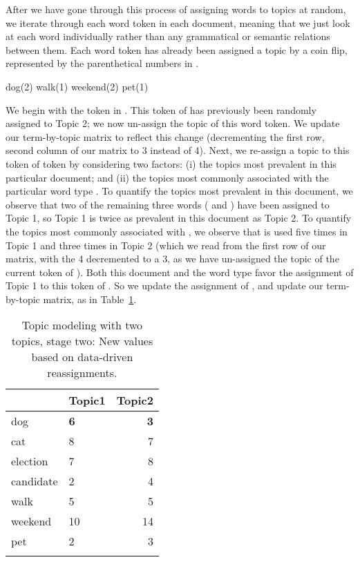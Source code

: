 After we have gone through this process of assigning words to topics at
random, we iterate through each word token in each document, meaning
that we just look at each word individually rather than any grammatical or semantic relations
between them.  Each word token has already been assigned a topic by a
coin flip, represented by the parenthetical numbers in .

\ea  \label{ex:dogdoc} dog(2) walk(1) weekend(2) pet(1)
\z

We begin with the token  in .  This token of
 has previously been randomly assigned to Topic 2; we
now un-assign the topic of this word token.  We update our
term-by-topic matrix to reflect this change (decrementing the first row,
second column of our matrix to 3 instead of 4).  Next, we re-assign a
topic to this token of  token by considering two factors:
(i) the topics most prevalent in this particular document; and (ii)
the topics most commonly associated with the particular word type
.  To quantify the topics most prevalent in this document,
we observe that two of the remaining three words ( and
) have been assigned to Topic 1, so Topic 1 is twice as
prevalent in this document as Topic 2.  To quantify the topics most
commonly associated with , we observe that  is
used five times in Topic 1 and three times in Topic 2 (which we read from the
first row of our matrix, with the 4 decremented to a 3, as we have
un-assigned the topic of the current token of ).  Both
this document and the word type  favor the assignment of
Topic 1 to this token of .  So we update the assignment of
, and update our term-by-topic matrix, as in
Table~\ref{tab:topic-modeling2}.

\begin{table}
\begin{tabular}{llr}
\lsptoprule
  & Topic1 & Topic2 \\ \midrule
  dog & \textbf{6} & \textbf{3} \\
cat & 8 & 7 \\ 
election & 7  & 8 \\ 
candidate & 2 & 4  \\
walk & 5 & 5 \\ 
weekend & 10 & 14 \\ 
pet & 2 & 3 \\ 
\lspbottomrule
\end{tabular}
\caption{Topic modeling with two topics, stage two: New values based on data-driven reassignments.}
\label{tab:topic-modeling2}
\end{table}


